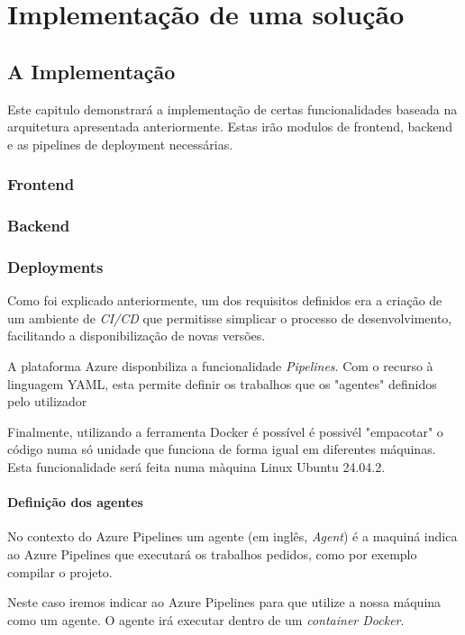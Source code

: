\chapter{Implementação de uma solução}

\section{A Implementação}

Este capitulo demonstrará a implementação de certas funcionalidades baseada na arquitetura apresentada anteriormente. Estas irão modulos de frontend, backend e as pipelines de deployment necessárias. 

\subsection{Frontend}

\subsection{Backend}

\subsection{Deployments}

Como foi explicado anteriormente, um dos requisitos definidos  era a criação de um ambiente de \textit{CI/CD} que permitisse simplicar o processo de desenvolvimento, facilitando a disponibilização de novas versões.

A plataforma Azure disponbiliza a funcionalidade \textit{Pipelines}. Com o recurso à linguagem YAML, esta permite definir os trabalhos que os "agentes" definidos pelo utilizador

Finalmente, utilizando a ferramenta Docker é possível é possivél "empacotar" o código numa só unidade que funciona de forma igual em diferentes máquinas. Esta funcionalidade será feita numa màquina Linux Ubuntu 24.04.2. 

\subsubsection{Definição dos agentes}

No contexto do Azure Pipelines um agente (em inglês, \textit{Agent}) é a maquiná indica ao Azure Pipelines que executará os trabalhos pedidos, como por exemplo compilar o projeto. 

Neste caso iremos indicar ao Azure Pipelines para que utilize a nossa máquina como um agente. O agente irá executar dentro de um \textit{container Docker}.

